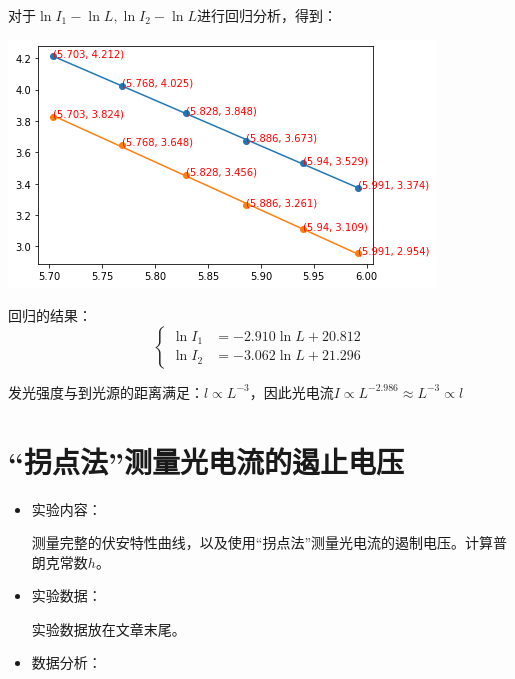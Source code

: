 \documentclass[a4paper]{ltxdoc}
\newenvironment{Figure}
  {\par\medskip\noindent\minipage{\linewidth}}
  {\endminipage\par\medskip}
\begin{document}
\begin{multicols}{2}
\begin{itemize}
              对于$\ln I_1 - \ln L,\ln I_2 - \ln L$进行回归分析，得到：
              \begin{Figure}
                  \centering
                  \includegraphics[width=\linewidth]{img/6.png}
              \end{Figure}
              回归的结果：
              $$
                  \left\{
                  \begin{aligned}
                      \ln I_1 & = -2.910 \ln L + 20.812 \\
                      \ln I_2 & = -3.062 \ln L + 21.296
                  \end{aligned}
                  \right.
              $$

              发光强度与到光源的距离满足：$l \propto L^{-3}$，因此光电流$I \propto L^{-2.986} \approx L^{-3} \propto l$
    \end{itemize}
    \section{“拐点法”测量光电流的遏止电压}
    \begin{itemize}
        \item 实验内容：

              测量完整的伏安特性曲线，以及使用“拐点法”测量光电流的遏制电压。计算普朗克常数$h$。

        \item 实验数据：

              实验数据放在文章末尾。

        \item 数据分析：


\end{itemize}
\end{multicols}
\end{document}
